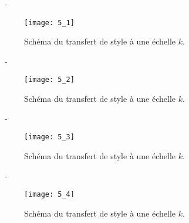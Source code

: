 \documentclass[aspectratio=169, 22pt]{beamer}
\begin{document}
\begin{frame}[noframenumbering]{\secname~- \subsecname}
  \begin{figure}
    \centering
    \texttt{[image: 5\_1]}
    \caption{Schéma du transfert de style à une échelle $k$.}
  \end{figure}
\end{frame}

\begin{frame}[noframenumbering]{\secname~- \subsecname}
  \begin{figure}
    \centering
    \texttt{[image: 5\_2]}
    \caption{Schéma du transfert de style à une échelle $k$.}
  \end{figure}
\end{frame}

\begin{frame}[noframenumbering]{\secname~- \subsecname}
  \begin{figure}
    \centering
    \texttt{[image: 5\_3]}
    \caption{Schéma du transfert de style à une échelle $k$.}
  \end{figure}
\end{frame}

\begin{frame}[noframenumbering]{\secname~- \subsecname}
  \begin{figure}
    \centering
    \texttt{[image: 5\_4]}
    \caption{Schéma du transfert de style à une échelle $k$.}
  \end{figure}
\end{frame}
\end{document}
